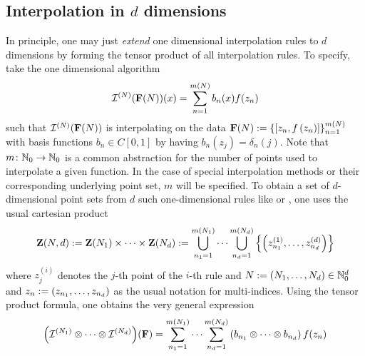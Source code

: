 \documentclass[12pt, oneside]{amsart}
\theoremstyle{definition}
\theoremstyle{remark}
\numberwithin{equation}{section}
\begin{document}
\subsection*{Interpolation in \(d\) dimensions} In principle, one may just 
\emph{extend} one dimensional interpolation rules to \(d\) dimensions by 
forming the tensor product of all interpolation rules. To specify, take the one 
dimensional algorithm
\begin{equation}\label{eq:general1dInterpolation}
    \mathcal{I}^{(N)}(\mathbf{F}(N))(x) = \sum_{n = 1}^{m(N)} b_{n}(x) f(z_n)
\end{equation}
such that \(\mathcal{I}^{(N)}(\mathbf{F}(N))\) is interpolating on the data \(\mathbf{F}(N) := 
\left\{\left[z_n, f\left(z_n\right)\right]\right\}_{n=1}^{m(N)}\) with basis functions 
\(b_n \in C[0, 1]\) by having \(b_n(z_j) = \delta_n(j)\). Note that 
$m\colon\mathbb{N}_0\to\mathbb{N}_0$ is a common abstraction for the number of points used to 
interpolate a given function. In the case of special interpolation methods or 
their corresponding underlying point set, $m$ will be specified.\newline
To obtain a set of $d$-dimensional point sets from $d$ such one-dimensional 
rules like  or , one uses the usual 
cartesian product %
\begin{equation}\label{eq:cartProduct}
	\mathbf{Z}(N, d) := \mathbf{Z}(N_1) \times \cdots \times \mathbf{Z}(N_d) := 
	\bigcup_{n_1=1}^{m(N_1)} \cdots \bigcup_{n_d=1}^{m(N_d)} 
	\left\{\left(z_{n_1}^{(1)}, \dots, z_{n_d}^{(d)}\right)\right\}
\end{equation}
where $z_j^{(i)}$ denotes the $j$-th point of the $i$-th rule and \(N := 
\left(N_1, \dots, N_d\right) \in \mathbb{N}_0^d\) and $z_n:= (z_{n_1}, \ldots, 
z_{n_d})$ as the usual notation for multi-indices. Using the 
tensor product formula, one obtains the very general expression
\begin{equation}\label{eq:tensorProdInterp}
    {\left( \mathcal{I}^{(N_1)} \otimes \cdots \otimes \mathcal{I}^{(N_d)} \right)}(\mathbf{F})
    = \sum_{n_1 = 1}^{m(N_1)} \cdots \sum_{n_d = 1}^{m(N_d)} \left( b_{n_1} 
    \otimes \cdots \otimes b_{n_d} \right) f(z_{n})
\end{equation}
\end{document}
